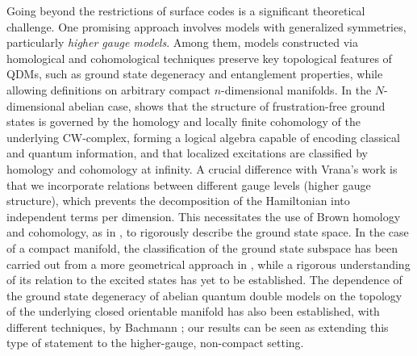 \documentclass[a4paper,12pt,twoside,reqno]{amsart}
\theoremstyle{plain}
\theoremstyle{definition}
\theoremstyle{remark}
\numberwithin{equation}{section}
\numberwithin{figure}{section}
\numberwithin{table}{section}
\begin{document}
	\medskip
	
	Going beyond the restrictions of surface codes is a significant theoretical challenge. One promising approach involves models with generalized symmetries, particularly \textit{higher gauge models}. Among them, models constructed via homological and cohomological techniques \cite{dealmeida2017topological} preserve key topological features of QDMs, such as ground state degeneracy and entanglement properties, while allowing definitions on arbitrary compact $n$-dimensional manifolds. In the $N$-dimensional abelian case, \cite{Vrana} shows that the structure of frustration-free ground states is governed by the homology and locally finite cohomology of the underlying CW-complex, forming a logical algebra capable of encoding classical and quantum information, and that localized excitations are classified by homology and cohomology at infinity. A crucial difference with Vrana’s work is that we incorporate relations between different gauge levels (higher gauge structure), which prevents the decomposition of the Hamiltonian into independent terms per dimension. This necessitates the use of Brown homology and cohomology, as in \cite{dealmeida2017topological}, to rigorously describe the ground state space. In the case of a compact manifold, the classification of the ground state subspace has been carried out from a more geometrical approach in \cite{Lorca2025}, while a rigorous understanding of its relation to the excited states has yet to be established. The dependence of the ground state degeneracy of abelian quantum double models on the topology of the underlying closed orientable manifold has also been established, with different techniques, by Bachmann \cite{Bachmann2017}; our results can be seen as extending this type of statement to the higher-gauge, non-compact setting.
	
	\medskip
	
\end{document}

